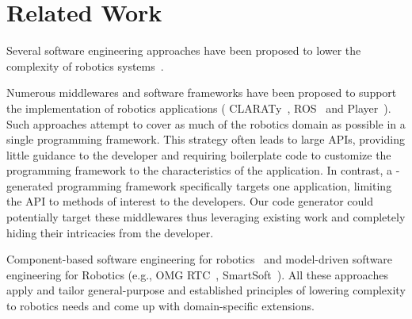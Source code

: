 \section{Related Work}
\label{sec:related}

Several software engineering approaches have been proposed to lower
the complexity of robotics systems~\cite{Brug07a}.

Numerous middlewares and software frameworks have been proposed to
support the implementation of robotics applications (\eg{}
CLARATy~\cite{Claraty}, ROS~\cite{ROS} and Player~\cite{Coll05a}).
Such approaches attempt to cover as much of the robotics domain as
possible in a single programming framework. This strategy often leads
to large APIs, providing little guidance to the developer and
requiring boilerplate code to customize the programming framework to
the characteristics of the application. In contrast, a
\diaspec{}-generated programming framework specifically targets one
application, limiting the API to methods of interest to the
developers. Our code generator could potentially target these
middlewares thus leveraging existing work and completely hiding their
intricacies from the developer.


Component-based software engineering for robotics~\cite{Brug07b} and
model-driven software engineering for Robotics (e.g., OMG
RTC~\cite{OMGRTC}, SmartSoft~\cite{Schl09a}). All these approaches
apply and tailor general-purpose and established principles of
lowering complexity to robotics needs and come up with domain-specific
extensions.
